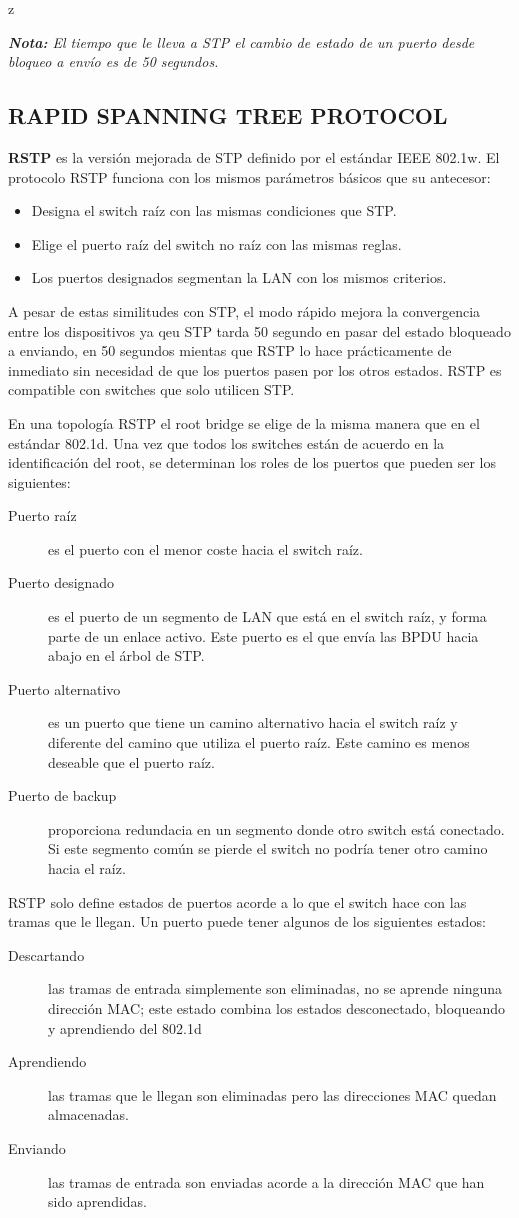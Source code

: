 z\documentclass[12pt]{article}
\begin{document}
\textit{\textbf{Nota:} El tiempo que le lleva a STP el cambio de estado de un puerto desde bloqueo a envío es de 50 segundos.}

\subsection{RAPID SPANNING TREE PROTOCOL}
\textbf{RSTP} es la versión mejorada de STP definido por el estándar IEEE 802.1w. El protocolo RSTP funciona con los mismos parámetros básicos que su antecesor:
\begin{itemize}
\item Designa el switch raíz con las mismas condiciones que STP.
\item Elige el puerto raíz del switch no raíz con las mismas reglas.
\item Los puertos designados segmentan la LAN con los mismos criterios.
\end{itemize}
A pesar de estas similitudes con STP, el modo rápido mejora la convergencia entre los dispositivos ya qeu STP tarda 50 segundo en pasar del estado bloqueado a enviando, en 50 segundos  mientas que RSTP lo hace prácticamente de inmediato sin necesidad de que los puertos pasen por los otros estados. RSTP es compatible con switches que solo utilicen STP.

En una topología RSTP el root bridge se elige de la misma manera que en el estándar 802.1d. Una vez que todos los switches están de acuerdo en la identificación del root, se determinan los roles de los puertos que pueden ser los siguientes:
\begin{description}
\item[Puerto raíz] es el puerto con el menor coste hacia el switch raíz.
\item[Puerto designado] es el puerto de un segmento de LAN que está en el switch raíz, y forma parte de un enlace activo. Este puerto es el que envía las BPDU hacia abajo en el árbol de STP.
\item[Puerto alternativo] es un puerto que tiene un camino alternativo hacia el switch raíz y diferente del camino que utiliza el puerto raíz. Este camino es menos deseable que el puerto raíz.
\item[Puerto de backup] proporciona redundacia en un segmento donde otro switch está conectado. Si este segmento común se pierde el switch no podría tener otro camino hacia el raíz.
\end{description}

RSTP solo define estados de puertos acorde a lo que el switch hace con las tramas que le llegan. Un puerto puede tener algunos de los siguientes estados:
\begin{description}
\item[Descartando] las tramas de entrada simplemente son eliminadas, no se aprende ninguna dirección MAC; este estado combina los estados desconectado, bloqueando y aprendiendo del 802.1d
\item[Aprendiendo] las tramas que le llegan son eliminadas pero las direcciones MAC quedan almacenadas.
\item[Enviando] las tramas de entrada son enviadas acorde a la dirección MAC que han sido aprendidas.
\end{description}
\end{document}
